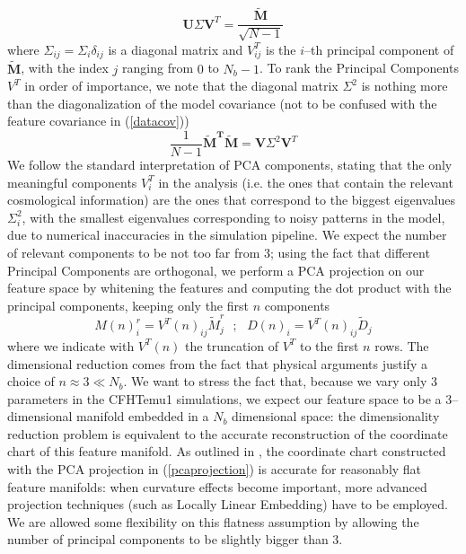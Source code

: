 \documentclass[reprint,aps,prd,superscriptaddress,showkeys]{revtex4-1}
\begin{document}
\begin{equation}
\label{svd}
\mathbf{U}\Sigma \mathbf{V}^T=\frac{\mathbf{\tilde{M}}}{\sqrt{N-1}}
\end{equation}   
%
where $\Sigma_{ij}=\Sigma_i\delta_{ij}$ is a diagonal matrix and $V^T_{ij}$ is the $i$--th principal component of $\mathbf{\tilde{M}}$, with the index $j$ ranging from $0$ to $N_b-1$. To rank the Principal Components $V^T$ in order of importance, we note that the diagonal matrix $\Sigma^2$ is nothing more than the diagonalization of the model covariance (not to be confused with the feature covariance in (\ref{datacov}))
\begin{equation}
\frac{1}{N-1}\mathbf{\tilde{M}^T\tilde{M}} = \mathbf{V}\Sigma^2\mathbf{V}^T
\end{equation} 
%
We follow the standard interpretation of PCA components, stating that the only meaningful components $V^T_i$ in the analysis (i.e. the ones that contain the relevant cosmological information) are the ones that correspond to the biggest eigenvalues $\Sigma^2_{i}$, with the smallest eigenvalues corresponding to noisy patterns in the model, due to numerical inaccuracies in the simulation pipeline. We expect the number of relevant components to be not too far from 3; using the fact that different Principal Components are orthogonal, we perform a PCA projection on our feature space by whitening the features and computing the dot product with the principal components, keeping only the first $n$ components
\begin{equation}
\label{pcaprojection}
M(n)_{i}^r = V^T(n)_{ij}\tilde{M}_j^r \,\,\,\, ; \,\,\,\,  D(n)_i = V^T(n)_{ij}\tilde{D}_j
\end{equation}
%
where we indicate with $V^T(n)$ the truncation of $V^T$ to the first $n$ rows. The dimensional reduction comes from the fact that physical arguments justify a choice of $n\approx 3\ll N_{b}$. We want to stress the fact that, because we vary only 3 parameters in the CFHTemu1 simulations, we expect our feature space to be a 3--dimensional manifold embedded in a $N_b$ dimensional space: the dimensionality reduction problem is equivalent to the accurate reconstruction of the coordinate chart of this feature manifold. As outlined in \citep{astroMLText}, the coordinate chart constructed with the PCA projection in (\ref{pcaprojection}) is accurate for reasonably flat feature manifolds: when curvature effects become important, more advanced projection techniques (such as Locally Linear Embedding) have to be employed. We are allowed some flexibility on this flatness assumption by allowing the number of principal components to be slightly bigger than 3. 
\end{document}
